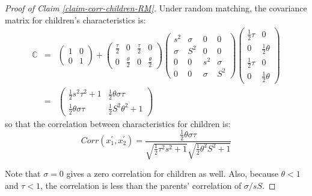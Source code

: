 \documentclass[
  12pt,
]{article}
\theoremstyle{definition}
\theoremstyle{definition}
\theoremstyle{definition}
\theoremstyle{definition}
\theoremstyle{remark}
\begin{document}
\begin{proof}[Proof of Claim \ref{claim-corr-children-RM}]

Under random matching, the covariance matrix for children's characteristics is:%
\begin{eqnarray*}
\mathbb{C} &=&\left( 
\begin{array}{cc}
1 & 0 \\ 
0 & 1%
\end{array}%
\right) +\left( 
\begin{array}{cccc}
\frac{\tau }{2} & 0 & \frac{\tau }{2} & 0 \\ 
0 & \frac{\theta }{2} & 0 & \frac{\theta }{2}%
\end{array}%
\right) \allowbreak \left( 
\begin{array}{cccc}
s^{2} & \sigma & 0 & 0 \\ 
\sigma & S^{2} & 0 & 0 \\ 
0 & 0 & s^{2} & \sigma \\ 
0 & 0 & \sigma & S^{2}%
\end{array}%
\right) \allowbreak \left( 
\begin{array}{cc}
\frac{1}{2}\tau & 0 \\ 
0 & \frac{1}{2}\theta \\ 
\frac{1}{2}\tau & 0 \\ 
0 & \frac{1}{2}\theta%
\end{array}%
\right) \\
&=&\left( 
\begin{array}{cc}
\frac{1}{2}s^{2}\tau ^{2}+1 & \frac{1}{2}\theta \sigma \tau \\ 
\frac{1}{2}\theta \sigma \tau & \frac{1}{2}S^{2}\theta ^{2}+1%
\end{array}%
\right)
\end{eqnarray*}%
so that the correlation between characteristics for children is: 
\[
Corr\left( x_{1}^{\prime },x_{2}^{\prime }\right) =\frac{\frac{1}{2}\theta
\sigma \tau }{\sqrt{\frac{1}{2}\tau ^{2}s^{2}+1}\sqrt{\frac{1}{2}\theta
^{2}S^{2}+1}} 
\]

Note that $\sigma =0$ gives a zero correlation for children as well. 
Also, because $\theta < 1$ and $\tau < 1$, the correlation is less than the 
parents' correlation of $\sigma/sS$.

\end{proof}
\end{document}

